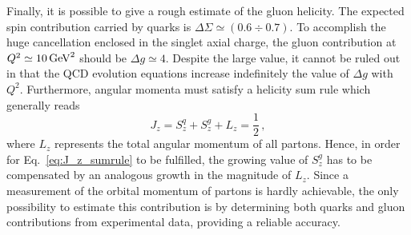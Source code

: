 Finally, it is possible to give a rough estimate of the gluon helicity. The expected spin contribution carried by quarks is $\Delta \Sigma \simeq (0.6  \div 0.7)$. To accomplish the huge cancellation enclosed in the singlet axial charge, the gluon contribution at $Q^2 \simeq 10 \, \textrm{GeV}^2$ should be $\Delta g \simeq 4$. Despite the large value, it cannot be ruled out in that the QCD evolution equations increase indefinitely the value of $\Delta g$ with $Q^2$. Furthermore, angular momenta must satisfy a helicity sum rule which generally reads
\begin{equation}
  J_{z} = S_{z}^{q} + S_{z}^{g} + L_z = \frac{1}{2} \,, 
  \label{eq:J_z_sumrule}
\end{equation} 
where $L_z$ represents the total angular momentum of all partons. Hence, in order for Eq.~\eqref{eq:J_z_sumrule} to be fulfilled, the growing value of $S_{z}^{g}$ has to be compensated by an analogous growth in the magnitude of $L_{z}$. Since a measurement of the orbital momentum of partons is hardly achievable, the only possibility to estimate this contribution is by determining both quarks and gluon contributions from experimental data, providing a reliable accuracy.

